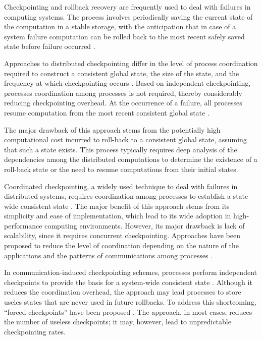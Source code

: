 Checkpointing and rollback recovery are frequently used to deal with
failures in computing systems. The process involves periodically
saving the current state of the computation in a stable storage, with
the anticipation that in case of a system failure computation can be
rolled back to the most recent safely saved state before failure
occurred \cite{agarwal_ics_2004, chandy_trans_1985, daly_fgcs_2006,
elnozahy_cs_2002, elnozahy_dsc_2004, geist_reli_1988, yudan_pdp_2008,
naksinehaboon_ccg_2008, oldfield_msst_2007, oliner_ics_2006}.

Approaches to distributed checkpointing differ in the level of process
coordination required to construct a consistent global state, the size
of the state, and the frequency at which checkpointing occurs
\cite{plank_ftc_1999, strom_tran_1985}. Based on independent checkpointing, 
processes coordination among processes is not required, thereby
considerably reducing checkpointing overhead. At the occurrence of a
failure, all processes resume computation from the most recent
consistent global state \cite{bhargava_rds_1988, chandy_trans_1985,
koo_acm_1986, pattabiraman_dsc_2005}.

The major drawback of this approach stems from the potentially high
computational cost incurred to roll-back to a consistent global state,
assuming that such a state exists. This process typically requires
deep analysis of the dependencies among the distributed computations
to determine the existence of a roll-back state or the need to resume
computations from their initial states.

Coordinated checkpointing, a widely used technique to deal with
failures in distributed systems, requires coordination among processes
to establish a state-wide consistent state
\cite{chandy_trans_1985}. The major benefit of this approach stems
from its simplicity and ease of implementation, which lead to its wide
adoption in high-performance computing environments. However, its
major drawback is lack of scalability, since it requires concurrent
checkpointing. Approaches have been proposed to reduce the level of
coordination depending on the nature of the applications and the
patterns of communications among processes \cite{koo_acm_1986}.

In communication-induced checkpointing schemes, processes perform
independent checkpoints to provide the basis for a system-wide
consistent state \cite{alvisi_ftc_1999, briatico_rdsd_1984}. Although
it reduces the coordination overhead, the approach may lead processes
to store useles states that are never used in future rollbacks. To
address this shortcoming, ``forced checkpoints'' have been proposed
\cite{helary_rds_1997}. The approach, in most cases, reduces the number of useless
checkpoints; it may, however, lead to unpredictable checkpointing
rates.

